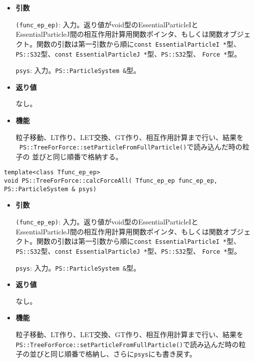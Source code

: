 \begin{itemize}

\item{{\bf 引数}}

{\tt (func\_ep\_ep)}: 入力。返り値がvoid型の{EssentialParticleI}と
{EssentialParticleJ}間の相互作用計算用関数ポインタ、もしくは関数オブジェ
クト。関数の引数は第一引数から順に{\tt const EssentialParticleI *}型、
{\tt PS::S32}型、{\tt const EssentialParticleJ *}型、{\tt PS::S32}型、
{\tt Force *}型。

{\tt psys}: 入力。{\tt PS::ParticleSystem \&}型。

\item{{\bf 返り値}}

なし。

\item{{\bf 機能}}

粒子移動、LT作り、LET交換、GT作り、相互作用計算まで行い、結果を\\ {\tt
PS::TreeForForce::setParticleFromFullParticle()}で読み込んだ時の粒子の
並びと同じ順番で格納する。

\end{itemize}

\begin{screen}
\begin{verbatim}
template<class Tfunc_ep_ep>
void PS::TreeForForce::calcForceAll( Tfunc_ep_ep func_ep_ep,  PS::ParticleSystem & psys) 

\end{verbatim}
\end{screen}

\begin{itemize}

\item{{\bf 引数}}

{\tt (func\_ep\_ep)}: 入力。返り値がvoid型の{EssentialParticleI}と
{EssentialParticleJ}間の相互作用計算用関数ポインタ、もしくは関数オブジェ
クト。関数の引数は第一引数から順に{\tt const EssentialParticleI *}型、
{\tt PS::S32}型、{\tt const EssentialParticleJ *}型、{\tt PS::S32}型、
{\tt Force *}型。

{\tt psys}: 入力。{\tt PS::ParticleSystem \&}型。

\item{{\bf 返り値}}

なし。

\item{{\bf 機能}}

粒子移動、LT作り、LET交換、GT作り、相互作用計算まで行い、結果を\\
{\tt PS::TreeForForce::setParticleFromFullParticle()}で読み込んだ時の粒
子の並びと同じ順番で格納し、さらに{\tt psys}にも書き戻す。

\end{itemize}









